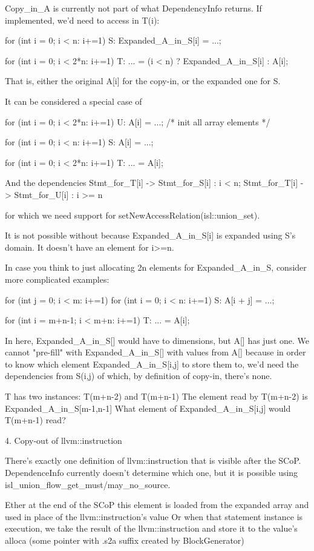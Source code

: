 Copy_in_A is currently not part of what DependencyInfo returns. If
implemented, we'd need to access in T(i):

    for (int i = 0; i < n: i+=1)
S:  Expanded_A_in_S[i] = ...;

    for (int i = 0; i < 2*n: i+=1)
T:   ... = (i < n) ? Expanded_A_in_S[i] : A[i];

That is, either the original A[i] for the copy-in, or the expanded one for S.

It can be considered a special case of

    for (int i = 0; i < 2*n: i+=1)
U:  A[i] = ...; /* init all array elements */

    for (int i = 0; i < n: i+=1)
S:  A[i] = ...;

    for (int i = 0; i < 2*n: i+=1)
T:   ... = A[i];

And the dependencies
{ Stmt_for_T[i] -> Stmt_for_S[i] : i < n; Stmt_for_T[i] ->
Stmt_for_U[i] : i >= n }

for which we need support for setNewAccessRelation(isl::union_set).

It is not possible without because Expanded_A_in_S[i] is expanded
using S's domain. It doesn't have an element for i>=n.

In case you think to just allocating 2n elements for Expanded_A_in_S,
consider more complicated examples:

for (int j = 0; i < m: i+=1)
    for (int i = 0; i < n: i+=1)
S:  A[i + j] = ...;

for (int i = m+n-1; i < m+n: i+=1)
T:   ... = A[i];


In here, Expanded_A_in_S[] would have to dimensions, but A[] has just
one. We cannot "pre-fill" with Expanded_A_in_S[] with values from A[]
 because in order to know which element Expanded_A_in_S[i,j] to store
them to, we'd need the dependencies from S(i,j) of which, by
definition of copy-in, there's none.

T has two instances: T(m+n-2) and T(m+n-1)
The element read by T(m+n-2) is Expanded_A_in_S[m-1,n-1]
What element of Expanded_A_in_S[i,j] would T(m+n-1) read?


4. Copy-out of llvm::instruction

There's exactly one definition of llvm::instruction that is visible
after the SCoP. DependenceInfo currently doesn't determine which one,
but it is possible using isl_union_flow_get_{must/may}_no_source.

Ether at the end of the SCoP this element is loaded from the expanded
array and used in place of the llvm::instruction's value
Or when that statement instance is execution, we take the result of
the llvm::instruction and store it to the value's alloca (some pointer
with .s2a suffix created by BlockGenerator)


